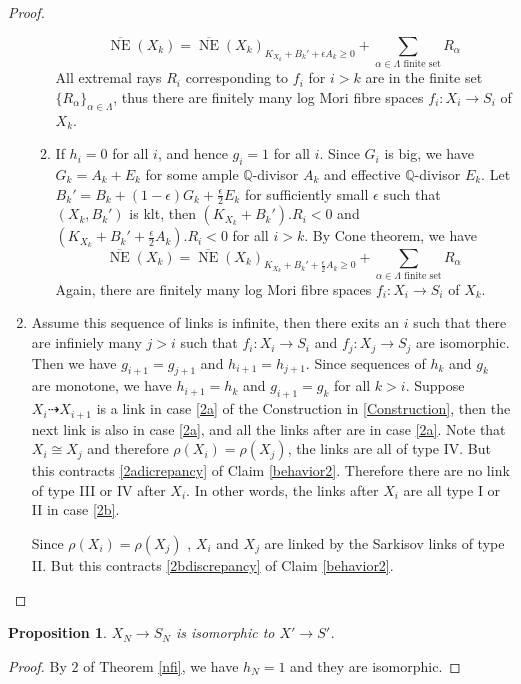 \documentclass[11pt]{amsart}
\numberwithin{equation}{section}
\newtheorem{prop}[defn]{Proposition}
\begin{document}
\begin{proof}
\begin{enumerate}
\begin{enumerate}
  \[
    \overline{\operatorname{NE}}(X_{k})=\overline{\operatorname{NE}}(X_{k})_{K_{X_{k}}+B_{k}'+\epsilon A_{k}\geqslant 0} +\sum_{\alpha \in\Lambda\text{ finite set}}R_{\alpha}
  \]
  All extremal rays $R_{i}$ corresponding to $f_{i}$ for $i>k$ are in the finite set $\{R_{\alpha}\}_{\alpha \in \Lambda} $, thus there are finitely many log Mori fibre spaces $f_{i}:X_{i}\to S_{i}$ of $X_{k}$.
\item If $h_{i}=0$ for all $i$, and hence $g_{i}=1$ for all $i$. Since $G_{i}$ is big, we have $G_{k}=A_{k}+E_{k}$ for some ample $\mathbb{Q}$-divisor $A_{k}$ and effective $\mathbb{Q}$-divisor $E_{k}$. Let $B_{k}'=B_{k}+(1-\epsilon)G_{k}+\frac{\epsilon}{2} E_{k}$ for sufficiently small $\epsilon$ such that $(X_{k},B_{k}')$ is klt, then $(K_{X_{k}}+B_{k}').R_{i}<0$ and $(K_{X_{k}}+B_{k}'+\frac{\epsilon}{2} A_{k}).R_{i}<0$ for all $i>k$. By Cone theorem, we have 
\[
    \overline{\operatorname{NE}}(X_{k})=\overline{\operatorname{NE}}(X_{k})_{K_{X_{k}}+B_{k}'+\frac{\epsilon}{2}A_{k}\geqslant 0} +\sum_{\alpha \in\Lambda\text{ finite set}}R_{\alpha}
  \]
  Again, there are finitely many log Mori fibre spaces $f_{i}:X_{i}\to S_{i}$ of $X_{k}$.

\end{enumerate}
\item Assume this sequence of links is infinite, then there exits an  $i$ such that there are infiniely many $j>i$ such that $f_{i}:X_{i}\to S_{i}  $ and $f_{j}:X_{j}\to S_{j}$ are isomorphic. Then we have $g_{i+1}=g_{j+1}$ and $h_{i+1}=h_{j+1}$. Since sequences of $h_{k}$ and $g_{k}$ are monotone, we have $h_{i+1}=h_{k}$ and  $g_{i+1}=g_{k}$ for all $k>i$. Suppose $X_{i}\dashrightarrow X_{i+1}$ is a link in case \ref{2a} of the Construction in \ref{Construction}, then the next link is also in case \ref{2a}, and all the links after are in case \ref{2a}. Note that $X_{i}\cong X_{j}$ and therefore $\rho(X_{i})=\rho(X_{j})$, the links are all of type IV. But this contracts  \ref{2adicrepancy} of Claim \ref{behavior2}. Therefore there are no link of type III or IV after $X_{i}$. In other words, the links after $X_{i}$ are all type I or II in case \ref{2b}.

  Since $\rho(X_{i})= \rho(X_{j})$ , $X_{i}$  and $X_{j}$ are linked by  the Sarkisov links of type II. But this contracts  \ref{2bdiscrepancy} of  Claim \ref{behavior2}.
\end{enumerate}  
\end{proof}
\begin{prop}\label{nfi2}
$X_{N}\to S_{N}$ is isomorphic to $X'\to S'$. 
\end{prop}
\begin{proof}
  By $2$ of Theorem \ref{nfi}, we have $h_{N}=1$ and they are isomorphic.
\end{proof}
\end{document}
